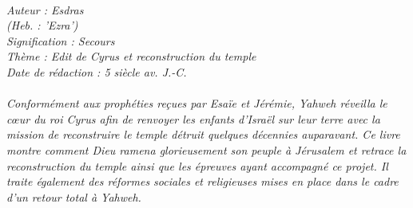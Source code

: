 \BFont
\noindent\hrulefill
{\footnotesize
\textit{
\bigskip
{\centering{}
\\Auteur : Esdras
\\(Heb. : 'Ezra')
\\Signification : Secours
\\Thème : Edit de Cyrus et reconstruction du temple 
\\Date de rédaction : 5 siècle av. J.-C.\\}
}
\textit{
\\Conformément aux prophéties reçues par Esaïe et Jérémie, Yahweh réveilla le cœur du roi Cyrus afin de renvoyer les enfants d'Israël sur leur terre avec la mission de reconstruire le temple détruit quelques décennies auparavant. Ce livre montre comment Dieu ramena glorieusement son peuple à Jérusalem et retrace la reconstruction du temple ainsi que les épreuves ayant accompagné ce projet. Il traite également des réformes sociales et religieuses mises en place dans le cadre d'un retour total à Yahweh.\bigskip
}
}
\par\nobreak\noindent\hrulefill
